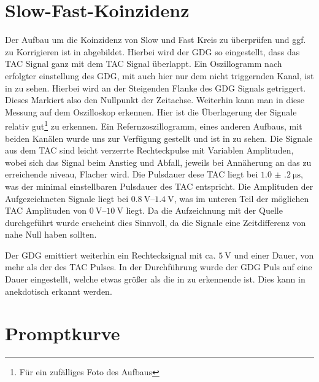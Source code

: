 \section{Slow-Fast-Koinzidenz}
Der Aufbau um die Koinzidenz von Slow und Fast Kreis zu überprüfen und ggf. zu Korrigieren ist in  abgebildet.
Hierbei wird der GDG so eingestellt, dass das TAC Signal ganz mit dem TAC Signal überlappt. Ein Oszillogramm nach erfolgter einstellung des GDG, mit auch hier nur dem nicht triggernden Kanal, ist in  zu sehen. Hierbei wird an der Steigenden Flanke des GDG Signals getriggert. Dieses Markiert also den Nullpunkt der Zeitachse. Weiterhin kann man in  diese Messung auf dem Oszilloskop erkennen. Hier ist die Überlagerung der Signale relativ gut\footnote{Für ein zufälliges Foto des Aufbaus} zu erkennen. Ein Refernzoszillogramm, eines anderen Aufbaus, mit beiden Kanälen wurde uns zur Verfügung gestellt und ist in  zu sehen. Die Signale aus dem TAC sind leicht verzerrte Rechteckpulse mit Variablen Amplituden, wobei sich das Signal beim Anstieg und Abfall, jeweils bei Annäherung an das zu erreichende niveau, Flacher wird. Die Pulsdauer dese TAC liegt bei $\SI{1.0(2)}{\micro\second}$, was der minimal einstellbaren Pulsdauer des TAC entspricht\cite{tac}. Die Amplituden der Aufgezeichneten Signale liegt bei $\SIrange{0.8}{1.4}{\volt}$, was im unteren Teil der möglichen TAC Amplituden von $\SIrange{0}{10}{\volt}$ liegt. Da die Aufzeichnung mit der \na Quelle durchgeführt wurde erscheint dies Sinnvoll, da die Signale eine Zeitdifferenz von nahe Null haben sollten.

Der GDG emittiert weiterhin ein Rechtecksignal mit ca. $\SI{5}{\volt}$ und einer Dauer, von mehr als der des TAC Pulses. In der Durchführung wurde der GDG Puls auf eine Dauer eingestellt, welche etwas größer als die in  zu erkennende ist. Dies kann in  anekdotisch erkannt werden.



\section{Promptkurve}

